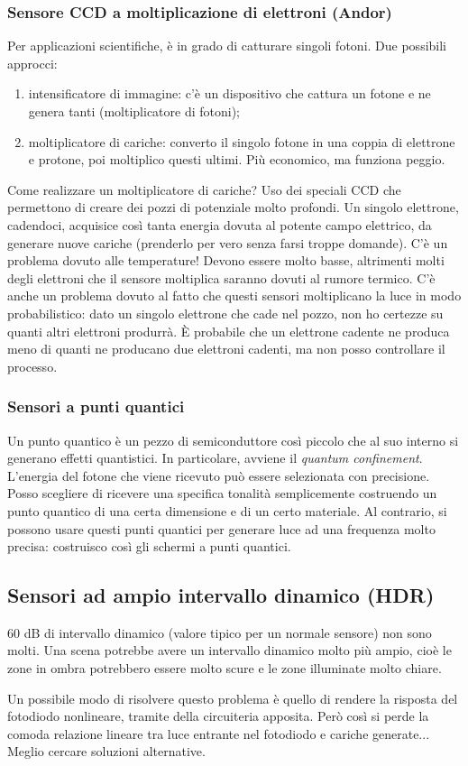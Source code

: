 \documentclass[a4paper,11pt]{article}
\begin{document}
\subsubsection{Sensore CCD a moltiplicazione di elettroni (Andor)}
Per applicazioni scientifiche, è in grado di catturare singoli fotoni.
Due possibili approcci:
\begin{enumerate}
    \item intensificatore di immagine: c'è un dispositivo che cattura un fotone e ne genera tanti (moltiplicatore di fotoni);
    \item moltiplicatore di cariche: converto il singolo fotone in una coppia di elettrone e protone, poi moltiplico questi ultimi. Più economico, ma funziona peggio.
\end{enumerate}
Come realizzare un moltiplicatore di cariche? Uso dei speciali CCD che permettono di creare dei pozzi di potenziale
molto profondi. Un singolo elettrone, cadendoci, acquisice così tanta energia dovuta al potente campo elettrico, da generare
nuove cariche (prenderlo per vero senza farsi troppe domande).
C'è un problema dovuto alle temperature! Devono essere molto basse, altrimenti molti degli elettroni che il sensore moltiplica saranno dovuti al rumore termico.
C'è anche un problema dovuto al fatto che questi sensori moltiplicano la luce in modo probabilistico: dato un singolo elettrone che cade
nel pozzo, non ho certezze su quanti altri elettroni produrrà. È probabile che un elettrone cadente ne produca meno di
quanti ne producano due elettroni cadenti, ma non posso controllare il processo.

\subsubsection{Sensori a punti quantici}
Un punto quantico è un pezzo di semiconduttore così piccolo che al suo interno si generano effetti quantistici.
In particolare, avviene il \textit{quantum confinement}. L'energia del fotone che viene ricevuto può essere selezionata
con precisione. Posso scegliere di ricevere una specifica tonalità semplicemente costruendo un punto quantico
di una certa dimensione e di un certo materiale. Al contrario, si possono usare questi punti quantici per generare luce ad una frequenza molto precisa: costruisco così gli schermi a punti quantici.

\subsection{Sensori ad ampio intervallo dinamico (HDR)}
60 dB di intervallo dinamico (valore tipico per un normale sensore) non sono molti. Una scena potrebbe avere un intervallo dinamico molto più ampio,
cioè le zone in ombra potrebbero essere molto scure e le zone illuminate molto chiare.
\par
Un possibile modo di risolvere questo problema è quello di rendere la risposta del fotodiodo nonlineare, tramite della circuiteria apposita. Però così
si perde la comoda relazione lineare tra luce entrante nel fotodiodo e cariche generate... Meglio cercare soluzioni alternative.
\end{document}
